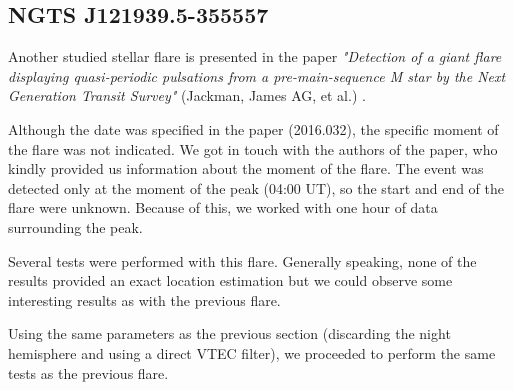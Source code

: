 
\subsection{NGTS J121939.5-355557}

Another studied stellar flare is presented in the paper \textit{"Detection of a giant flare displaying quasi-periodic pulsations from a pre-main-sequence M star by the Next Generation Transit Survey"} (Jackman, James AG, et al.) \cite{jackman2018detection}. 

Although the date was specified in the paper (2016.032), the specific moment of the flare was not indicated. We got in touch with the authors of the paper, who kindly provided us information about the moment of the flare. The event was detected only at the moment of the peak (04:00 UT), so the start and end of the flare were unknown. Because of this, we worked with one hour of data surrounding the peak.

Several tests were performed with this flare. Generally speaking, none of the results provided an exact location estimation but we could observe some interesting results as with the previous flare.

Using the same parameters as the previous section (discarding the night hemisphere and using a direct VTEC filter), we proceeded to perform the same tests as the previous flare.

